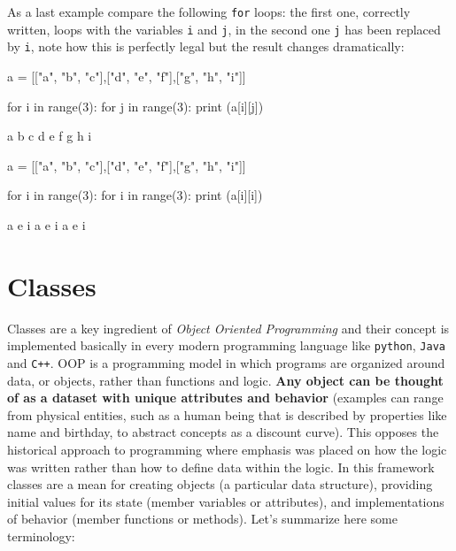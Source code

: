 As a last example compare the following \texttt{for} loops: the first one, correctly written, loops with the variables \texttt{i} and \texttt{j}, in the second one \texttt{j} has been replaced by \texttt{i}, note how this is perfectly legal but the result changes dramatically:

\begin{ipython}
a = [["a", "b", "c"],["d", "e", "f"],["g", "h", "i"]]

for i in range(3):
    for j in range(3):
        print (a[i][j])
\end{ipython}
\begin{ioutput} 	  
a
b
c
d
e
f
g
h
i
\end{ioutput}

\begin{ipython}
a = [["a", "b", "c"],["d", "e", "f"],["g", "h", "i"]]

for i in range(3):
    for i in range(3):
        print (a[i][i])
\end{ipython}
\begin{ioutput} 	  
a
e
i
a
e
i
a
e
i
\end{ioutput}

\section{Classes}
\label{sec:class}

Classes are a key ingredient of \emph{Object Oriented Programming} and their concept is implemented basically in every modern programming language like \texttt{python}, \texttt{Java} and \texttt{C++}. OOP is a programming model in which programs are organized around data, or objects, rather than functions and logic.
\textbf{Any object can be thought of as a dataset with unique attributes and behavior} (examples can range from physical entities, such as a human being that is described by properties like name and birthday, to abstract concepts as a discount curve). This opposes the historical 
approach to programming where emphasis was placed on how the logic was written rather than how to define data within the logic. In this framework classes are a mean for creating objects (a particular data structure), providing initial values for its state (member variables or attributes), and implementations of behavior (member functions or methods).
Let's summarize here some terminology:

